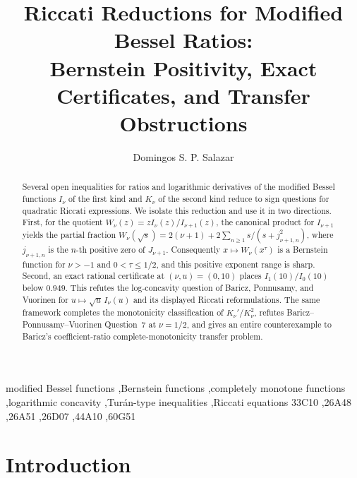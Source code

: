 \documentclass[preprint,12pt]{elsarticle}
\theoremstyle{plain}
\theoremstyle{definition}
\theoremstyle{remark}
\begin{document}
\begin{frontmatter}

\title{Riccati Reductions for Modified Bessel Ratios:\\
Bernstein Positivity, Exact Certificates, and Transfer Obstructions}
\author[addr1]{Domingos S. P. Salazar}
\address[addr1]{Unidade de Educa\c{c}\~ao a Dist\^ancia e Tecnologia,
Universidade Federal Rural de Pernambuco,
52171-900 Recife, Pernambuco, Brazil}

\begin{abstract}
Several open inequalities for ratios and logarithmic derivatives of
the modified Bessel functions \(I_\nu\) of the first kind and \(K_\nu\) of
the second kind reduce to sign questions for quadratic Riccati expressions.
We isolate this reduction and use it in two directions. First, for the quotient
\(W_\nu(z)=zI_\nu(z)/I_{\nu+1}(z)\), the canonical product for \(I_{\nu+1}\)
yields the partial fraction
\(W_\nu(\sqrt s)=2(\nu+1)+2\sum_{n\ge1}s/(s+j_{\nu+1,n}^2)\), where
\(j_{\nu+1,n}\) is the \(n\)-th positive zero of \(J_{\nu+1}\).
Consequently \(x\mapsto W_\nu(x^\tau)\) is a Bernstein function for
\(\nu>-1\) and \(0<\tau\le1/2\), and this positive exponent range is sharp.
Second, an exact rational certificate at \((\nu,u)=(0,10)\) places
\(I_1(10)/I_0(10)\) below \(0.949\). This refutes the log-concavity question
of Baricz, Ponnusamy, and Vuorinen for \(u\mapsto \sqrt u\,I_\nu(u)\) and its
displayed Riccati reformulations.
The same framework completes the monotonicity classification of
\(K_\nu'/K_\nu^2\), refutes Baricz--Ponnusamy--Vuorinen Question~7 at
\(\nu=1/2\), and gives an entire counterexample to Baricz's
coefficient-ratio complete-monotonicity transfer problem.
\end{abstract}

\begin{keyword}
modified Bessel functions \sep Bernstein functions \sep completely monotone functions \sep logarithmic concavity \sep Tur\'an-type inequalities \sep Riccati equations
\MSC[2020] 33C10 \sep 26A48 \sep 26A51 \sep 26D07 \sep 44A10 \sep 60G51
\end{keyword}

\end{frontmatter}

\section{Introduction}
\end{document}
